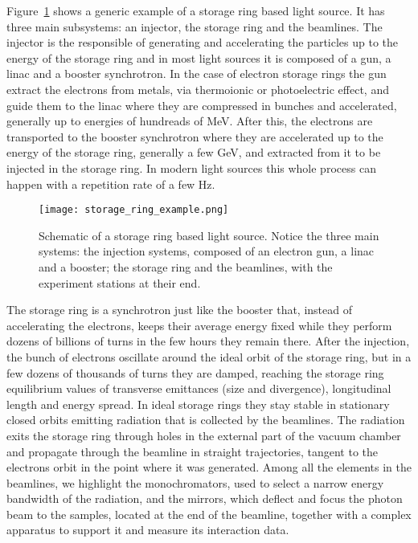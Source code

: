     Figure~\ref{fig:light_source_example} shows a generic example of a storage ring based light source. It has three main subsystems: an injector, the storage ring and the beamlines. The injector is the responsible of generating and accelerating the particles up to the energy of the storage ring and in most light sources it is composed of a gun, a \gls{linac} and a booster synchrotron. In the case of electron storage rings the gun extract the electrons from metals, via thermoionic or photoelectric effect, and guide them to the \gls{linac} where they are compressed in bunches and accelerated, generally up to energies of hundreads of \si{\mega\electronvolt}. After this, the electrons are transported to the booster synchrotron where they are accelerated up to the energy of the storage ring, generally a few \si{\giga\electronvolt}, and extracted from it to be injected in the storage ring. In modern light sources this whole process can happen with a repetition rate of a few \si{\hertz}.

    \begin{figure}[b!]
        \center
        \texttt{[image: storage\_ring\_example.png]}
        \caption[Schematic of a storage ring based light source.]{Schematic of a storage ring based light source. Notice the three main systems: the injection systems, composed of an electron gun, a \gls{linac} and a booster; the storage ring and the beamlines, with the experiment stations at their end.}
        \label{fig:light_source_example}
    \end{figure}

    The storage ring is a synchrotron just like the booster that, instead of accelerating the electrons, keeps their average energy fixed while they perform dozens of billions of turns in the few hours they remain there. After the injection, the bunch of electrons oscillate around the ideal orbit of the storage ring, but in a few dozens of thousands of turns they are damped, reaching the storage ring equilibrium values of transverse emittances (size and divergence), longitudinal length and energy spread. In ideal storage rings they stay stable in stationary closed orbits emitting radiation that is collected by the beamlines. The radiation exits the storage ring through holes in the external part of the vacuum chamber and propagate through the beamline in straight trajectories, tangent to the electrons orbit in the point where it was generated. Among all the elements in the beamlines, we highlight the monochromators, used to select a narrow energy bandwidth of the radiation, and the mirrors, which deflect and focus the photon beam to the samples, located at the end of the beamline, together with a complex apparatus to support it and measure its interaction data.

